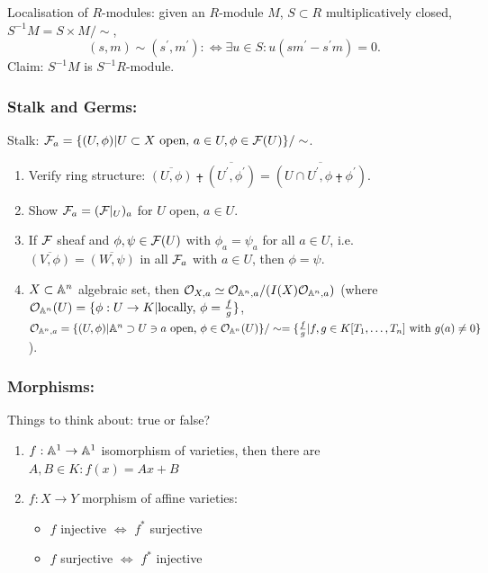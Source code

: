 \documentclass[a4paper,11pt]{article}
\begin{document}
{					\begin{remark}
						Localisation of $R$-modules: given an $R$-module $M$, $S\subset R$ multiplicatively closed, $S^{-1}M=S\times M/\sim$,
						\begin{equation*}
							(s,m)\sim(s^\prime,m^\prime):\Longleftrightarrow\exists u\in S: u(sm^\prime-s^\prime m)=0.
						\end{equation*}
						Claim: $S^{-1}M$ is $S^{-1}R$-module.
					\end{remark}

				\subsubsection*{Stalk and Germs:}

					Stalk: $\F_a=\{(U,\phi)|U\subset X\text{ open, }a\in U,\phi\in\F(U)\}/\sim$.

					\begin{exc}
						\begin{enumerate}
							\item Verify ring structure: $\overline{(U,\phi)}\plusdot\overline{(U^\prime,\phi^\prime)}=\overline{(U\cap U^\prime,\phi\plusdot\phi^\prime)}$.
							\item Show $\F_a=(\F|_U)_a$ for $U$ open, $a\in U$.
							\item If $\F$ sheaf and $\phi,\psi\in\F(U)$ with $\phi_a=\psi_a$ for all $a\in U$, i.e. $\overline{(V,\phi)}=\overline{(W,\psi)}$ in all $\F_a$ with $a\in U$, then $\phi=\psi$.
							\item $X\subset\AA^n$ algebraic set, then $\O_{X,a}\simeq\O_{\AA^n,a}/(I(X)\O_{\AA^n,a})$ (where $\O_{\AA^n}(U)=\{\phi:U\rightarrow K|\text{locally, }\phi=\frac{f}{g}\}$, $\O_{\AA^n,a}=\{(U,\phi)|\AA^n\supset U\ni a\text{ open, }\phi\in\O_{\AA^n}(U)\}/\sim=\{\frac{f}{g}|f,g\in \K\text{ with }g(a)\neq0\}$).
						\end{enumerate}
					\end{exc}

				\subsubsection*{Morphisms:}

					Things to think about: true or false?
					\begin{enumerate}
						\item $f:\AA^1\rightarrow\AA^1$ isomorphism of varieties, then there are $A,B\in K:f(x)=Ax+B$
						\item $f:X\rightarrow Y$ morphism of affine varieties:
						\begin{itemize}
							\item $f$ injective $\Longleftrightarrow$ $f^\ast$ surjective
							\item $f$ surjective $\Longleftrightarrow$ $f^\ast $ injective
						\end{itemize}
					\end{enumerate}

}
\end{document}
